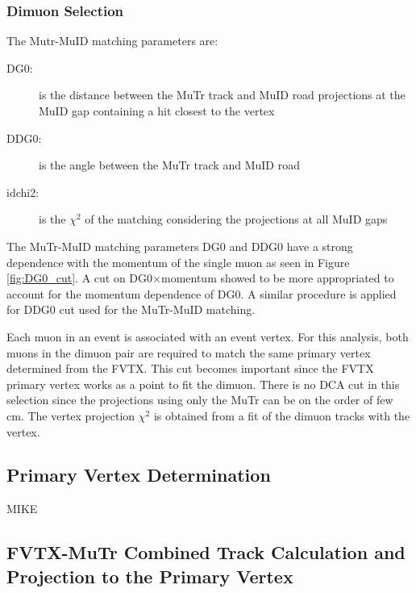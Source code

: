 \documentclass[12pt]{article}
\begin{document}
\pagebreak
\newpage


\subsubsection{Dimuon Selection}
\label{sec:dimuon_selection}

The Mutr-MuID matching parameters are:

\begin{description}
	\item [DG0:] is the distance between the MuTr track and MuID road projections at the MuID gap containing a hit closest to the vertex
	\item [DDG0:] is the angle between the MuTr track and MuID road
	\item [idchi2:] is the $\chi^2$ of the matching considering the projections at all MuID gaps
\end{description}

The MuTr-MuID matching parameters DG0 and DDG0 have a strong dependence with the
momentum of the single muon as seen in Figure \ref{fig:DG0_cut}. A cut on DG0$\times$momentum 
showed to be more appropriated to account for the momentum dependence of DG0. A similar procedure is applied for DDG0 cut used for the MuTr-MuID matching.
 
Each muon in an event is associated with an event vertex. For this analysis, both muons 
in the dimuon pair are required to match the same primary
vertex determined from the FVTX. This cut becomes important since the FVTX
primary vertex works as a point to fit the dimuon. There is no DCA cut in this selection since the
projections using only the MuTr can be on the order of few cm. 
The vertex projection $\chi^2$ is obtained from a fit of the dimuon tracks with the vertex. 

\subsection{Primary Vertex Determination}
\label{sec:PVDet}

MIKE

\subsection{FVTX-MuTr Combined Track Calculation and Projection to the Primary Vertex}
\label{sec:combine_fvtx_mutr}
\end{document}
